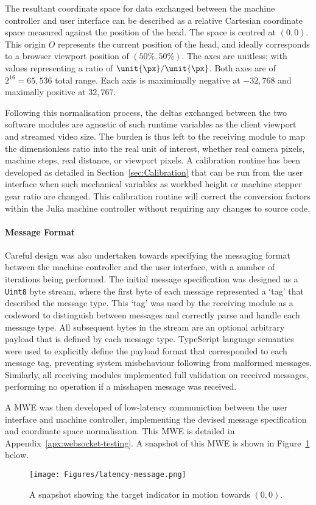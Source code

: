 \documentclass[12pt,british,UKenglish]{article}
\begin{document}
The resultant coordinate space for data exchanged between the machine controller and user interface can be described as a relative Cartesian coordinate space measured against the position of the head.
The space is centred at $(0, 0)$.
This origin $O$ represents the current position of the head, and ideally corresponds to a browser viewport position of $(50\%, 50\%)$.
The axes are unitless; with values representing a ratio of $\unit{\px} / \unit{\px}$.
Both axes are of $2^{16}=65,536$ total range.
Each axis is maximimally negative at $-32,768$ and maximally positive at $32,767$.

Following this normalisation process, the deltas exchanged between the two software modules are agnostic of such runtime variables as the client viewport and streamed video size.
The burden is thus left to the receiving module to map the dimensionless ratio into the real unit of interest, whether real camera pixels, machine steps, real distance, or viewport pixels.
A calibration routine has been developed as detailed in Section~\ref{sec:Calibration} that can be run from the user interface when such mechanical variables as workbed height or machine stepper gear ratio are changed.
This calibration routine will correct the conversion factors within the Julia machine controller without requiring any changes to source code.

\paragraph{Message Format}
Careful design was also undertaken towards specifying the messaging format between the machine controller and the user interface, with a number of iterations being performed.
The initial message specification was designed as a \texttt{Uint8} byte stream, where the first byte of each message represented a `tag' that described the message type.
This `tag' was used by the receiving module as a codeword to distinguish between messages and correctly parse and handle each message type.
All subsequent bytes in the stream are an optional arbitrary payload that is defined by each message type.
TypeScript language semantics were used to explicitly define the payload format that corresponded to each message tag, preventing system misbehaviour following from malformed messages.
Similarly, all receiving modules implemented full validation on received messages, performing no operation if a misshapen message was received.

A \ac{MWE} was then developed of low-latency communiction between the user interface and machine controller, implementing the devised message specification and coordinate space normalisation.
This \ac{MWE} is detailed in Appendix~\ref{apx:websocket-testing}.
A snapshot of this \ac{MWE} is shown in Figure~\ref{fig:latency-message} below.
\begin{figure}[hbtp]
    \texttt{[image: Figures/latency-message.png]}
    \centering
    \caption{A snapshot showing the target indicator in motion towards $(0, 0)$.}
    \label{fig:latency-message}
\end{figure}
\end{document}
